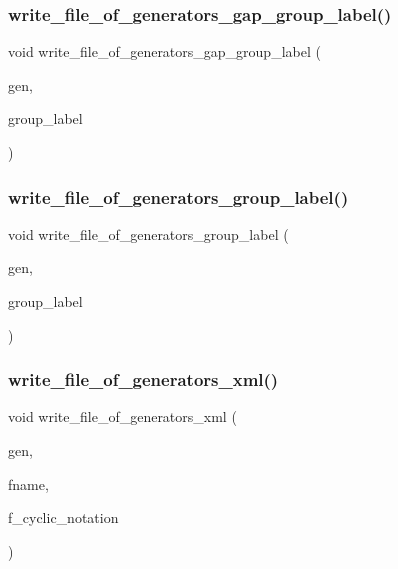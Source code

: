 \subsubsection{\texorpdfstring{write\+\_\+file\+\_\+of\+\_\+generators\+\_\+gap\+\_\+group\+\_\+label()}{write\_file\_of\_generators\_gap\_group\_label()}}
{\footnotesize\ttfamily void write\+\_\+file\+\_\+of\+\_\+generators\+\_\+gap\+\_\+group\+\_\+label (\begin{DoxyParamCaption}\item[{\mbox{\hyperlink{class_vector}{Vector}} \&}]{gen,  }\item[{char $\ast$}]{group\+\_\+label }\end{DoxyParamCaption})}

\mbox{\label{perm__group__gens_8_c_ae43736cf13bd458db457ffee9f2dc141}} 
\subsubsection{\texorpdfstring{write\+\_\+file\+\_\+of\+\_\+generators\+\_\+group\+\_\+label()}{write\_file\_of\_generators\_group\_label()}}
{\footnotesize\ttfamily void write\+\_\+file\+\_\+of\+\_\+generators\+\_\+group\+\_\+label (\begin{DoxyParamCaption}\item[{\mbox{\hyperlink{class_vector}{Vector}} \&}]{gen,  }\item[{char $\ast$}]{group\+\_\+label }\end{DoxyParamCaption})}

\mbox{\label{perm__group__gens_8_c_afdd96b23ffd162968dc51417edd6b516}} 
\subsubsection{\texorpdfstring{write\+\_\+file\+\_\+of\+\_\+generators\+\_\+xml()}{write\_file\_of\_generators\_xml()}}
{\footnotesize\ttfamily void write\+\_\+file\+\_\+of\+\_\+generators\+\_\+xml (\begin{DoxyParamCaption}\item[{\mbox{\hyperlink{class_vector}{Vector}} \&}]{gen,  }\item[{char $\ast$}]{fname,  }\item[{\mbox{\hyperlink{galois_8h_a09fddde158a3a20bd2dcadb609de11dc}{I\+NT}}}]{f\+\_\+cyclic\+\_\+notation }\end{DoxyParamCaption})}

